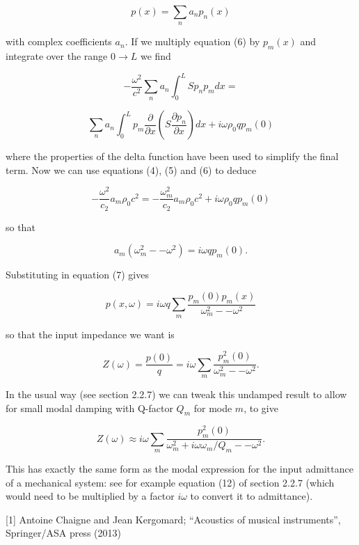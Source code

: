   $$p(x) = \sum_n{a_n p_n(x)} \tag{7}$$ 

  with complex coefficients $a_n$. If we multiply equation (6) by $p_m(x)$ and 
  integrate over the range $0 \rightarrow L$ we find 

  $$-\dfrac{\omega^2}{c^2} \sum_n{a_n \int_0^L{S p_n p_m dx}}=$$ 

  $$\sum_n{a_n \int_0^L{p_m \dfrac{\partial}{\partial x}\left(S\dfrac{\partial 
  p_n}{\partial x} \right) dx}} + i \omega \rho_0 q p_m(0) \tag{8}$$ 

  where the properties of the delta function have been used to simplify the 
  final term. Now we can use equations (4), (5) and (6) to deduce 

  $$-\dfrac{\omega^2}{c_2}a_m \rho_0 c^2 = -\dfrac{\omega_m^2}{c_2}a_m \rho_0 
  c^2 + i \omega \rho_0 q p_m(0) \tag{9}$$ 

  so that 

  $$a_m (\omega_m^2 -- \omega^2) = i \omega q p_m(0). \tag{10}$$ 

  Substituting in equation (7) gives 

  $$p(x,\omega)= i \omega q \sum_m{\dfrac{p_m(0) p_m(x)}{\omega_m^2 -- 
  \omega^2}} \tag{11}$$ 

  so that the input impedance we want is 

  $$Z(\omega) = \dfrac{p(0)}{q} = i \omega \sum_m{\dfrac{p_m^2(0)}{\omega_m^2 
  -- \omega^2}} . \tag{12}$$ 

  In the usual way (see section 2.2.7) we can tweak this undamped result to 
  allow for small modal damping with Q-factor $Q_m$ for mode $m$, to give 

  $$Z(\omega) \approx i \omega \sum_m{\dfrac{p_m^2(0)}{\omega_m^2 + i \omega 
  \omega_m/Q_m -- \omega^2}} . \tag{13}$$ 

  This has exactly the same form as the modal expression for the input 
  admittance of a mechanical system: see for example equation (12) of section 
  2.2.7 (which would need to be multiplied by a factor $i \omega$ to convert it 
  to admittance). 

  \sectionreferences{}[1] Antoine Chaigne and Jean Kergomard; “Acoustics of 
  musical instruments”, Springer/ASA press (2013) 